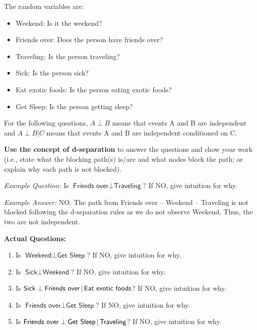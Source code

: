 \documentclass[submit]{harvardml}
\newcommand{\attr}[1]{\textsf{#1}}
\begin{document}
\begin{problem}
The random variables are:

\begin{itemize}
\item \attr{Weekend}: Is it the weekend?
\item \attr{Friends over}: Does the person have friends over?
\item \attr{Traveling}: Is the person traveling?
\item \attr{Sick}: Is the person sick?
\item \attr{Eat exotic foods}: Is the person eating exotic foods?
\item \attr{Get Sleep}: Is the person getting sleep?
\end{itemize}

\medskip

For the following questions, $A \perp B$ means that events A and B are
independent and $A \perp B | C$ means that events A and B are independent
conditioned on C.

\textbf{Use the concept of d-separation} to answer the
questions and show your work (i.e., state what the blocking path(s) is/are and what nodes block the path; or explain why each path is not blocked).

\textit{Example Question:} Is $\attr{Friends over} \perp \attr{Traveling}$? If NO, give intuition for why.

\textit{Example Answer:} NO. The path from Friends over -- Weekend -- Traveling is not blocked following the d-separation rules as we do not observe Weekend. Thus, the two are not independent. 

\textbf{Actual Questions:}

\begin{enumerate}
\item Is $\attr{Weekend} \perp \attr{Get Sleep}$?
  If NO, give intuition for why.

\item Is $\attr{Sick} \perp \attr{Weekend}$?
  If NO, give intuition for why.


\item Is $\attr{Sick} \perp \attr{Friends over}\given \attr{Eat exotic
  foods}$? If NO, give intuition for why.


\item Is $\attr{Friends over} \perp \attr{Get Sleep}$? If NO, give
  intuition for why.

\item Is $\attr{Friends over} \perp \attr{Get Sleep} \given
  \attr{Traveling}$? If NO, give intuition for why.


\end{enumerate}
\end{problem}
\end{document}
